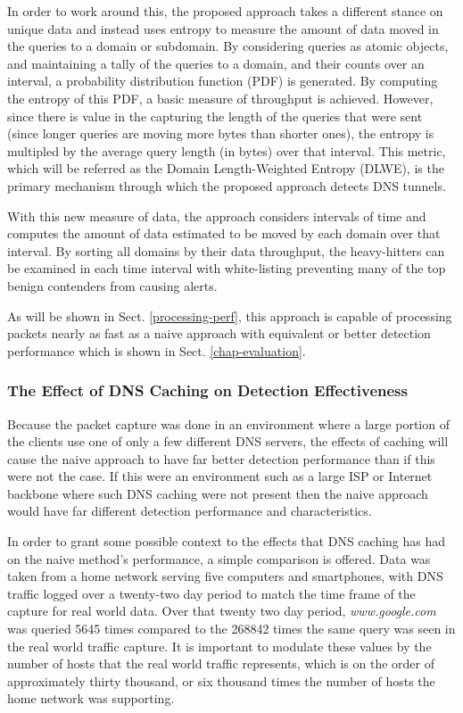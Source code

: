 \documentclass{llncs}
\begin{document}
In order to work around this, the proposed approach takes a different stance on
unique data and instead uses entropy to measure the amount of data moved in the
queries to a domain or subdomain. By considering queries as atomic objects, and
maintaining a tally of the queries to a domain, and their counts over an
interval, a probability distribution function (PDF) is generated. By computing
the entropy of this PDF, a basic measure of throughput is achieved. However,
since there is value in the capturing the length of the queries that were sent
(since longer queries are moving more bytes than shorter ones), the entropy is
multipled by the average query length (in bytes) over that interval. This
metric, which will be referred as the Domain Length-Weighted Entropy (DLWE), is
the primary mechanism through which the proposed approach detects DNS tunnels.

With this new measure of data, the approach considers intervals of time and
computes the amount of data estimated to be moved by each domain over that
interval. By sorting all domains by their data throughput, the heavy-hitters can
be examined in each time interval with white-listing preventing many of the top benign
contenders from causing alerts.

As will be shown in Sect. \ref{processing-perf}, this approach is capable of
processing packets nearly as fast as a naive approach with equivalent or better
detection performance which is shown in Sect. \ref{chap-evaluation}.

\subsubsection{The Effect of DNS Caching on Detection Effectiveness}
\label{dns-caching}

Because the packet capture was done in an environment where a large portion of
the clients use one of only a few different DNS servers, the effects of caching
will cause the naive approach to have far better detection performance than if this
were not the case. If this were an environment such as a large ISP or Internet
backbone where such DNS caching were not present then the naive approach would have
far different detection performance and characteristics.

In order to grant some possible context to the effects that DNS caching has had
on the naive method's performance, a simple comparison is offered. Data was
taken from a home network serving five computers and smartphones, with DNS
traffic logged over a twenty-two day period to match the time frame of the
capture for real world data. Over that twenty two day period,
\emph{www.google.com} was queried 5645 times compared to the 268842 times the
same query was seen in the real world traffic capture. It is important to modulate these
values by the number of hosts that the real world traffic represents, which
is on the order of approximately thirty thousand, or six thousand times the
number of hosts the home network was supporting.
\end{document}
